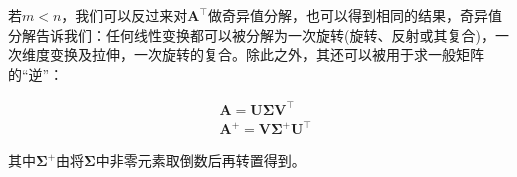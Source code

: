 \documentclass[UTF8]{book}
\begin{document}
若$m<n$，我们可以反过来对$\mathbf{A}^\top$做奇异值分解，也可以得到相同的结果，奇异值分解告诉我们：任何线性变换都可以被分解为一次旋转(旋转、反射或其复合)，一次维度变换及拉伸，一次旋转的复合。除此之外，其还可以被用于求一般矩阵的“逆”：
\begin{large}
    \begin{equation}
        \begin{aligned}
            &\mathbf{A}=\mathbf{U}\mathbf{\Sigma}\mathbf{V}^\top \\
            &\mathbf{A}^+=\mathbf{V}\mathbf{\Sigma}^+\mathbf{U}^\top
            \nonumber
        \end{aligned}
    \end{equation}
\end{large}
其中$\mathbf{\Sigma}^+$由将$\mathbf{\Sigma}$中非零元素取倒数后再转置得到。
\end{document}

